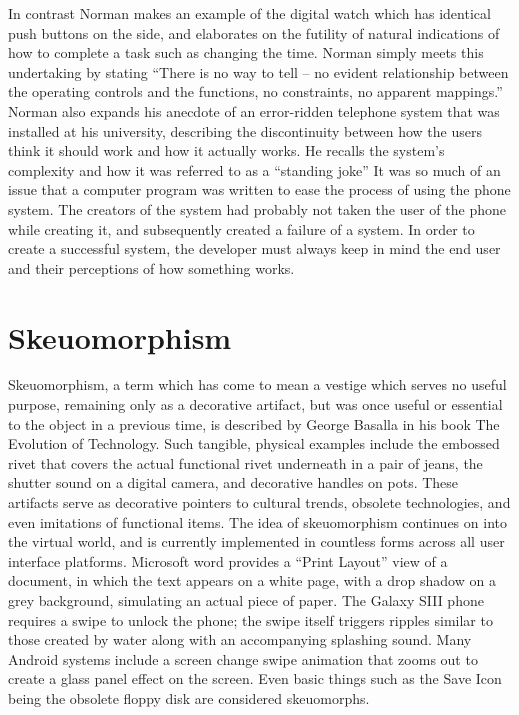 \documentclass[12pt onesided letterpaper]{report}
\begin{document}
In contrast Norman makes an example of the digital watch which has identical push buttons on the side, and elaborates on the futility of natural indications of how to complete a task such as changing the time.  Norman simply meets this undertaking by stating “There is no way to tell – no evident relationship between the operating controls and the functions, no constraints, no apparent mappings.”\cite[~p. 13]  {norman02}  Norman also expands his anecdote of an error-ridden telephone system that was installed at his university, describing the discontinuity between how the users think it should work and how it actually works.  He recalls the system’s complexity and how it was referred to as a “standing joke” It was so much of an issue that a computer program was written to ease the process of using the phone system.  The creators of the system had probably not taken the user of the phone while creating it, and subsequently created a failure of a system.  In order to create a successful system, the developer must always keep in mind the end user and their perceptions of how something works.

\section*{Skeuomorphism}
Skeuomorphism, a term which has come to mean a vestige which serves no useful purpose, remaining only as a decorative artifact, but was once useful or essential to the object in a previous time, is described by George Basalla in his book The Evolution of Technology.\cite[~p. 107-108]  {basalla88}  Such tangible, physical examples include the embossed rivet that covers the actual functional rivet underneath in a pair of jeans, the shutter sound on a digital camera, and decorative handles on pots.   These artifacts serve as decorative pointers to cultural trends, obsolete technologies, and even imitations of functional items.  The idea of skeuomorphism continues on into the virtual world, and is currently implemented in countless forms across all user interface platforms.  Microsoft word provides a “Print Layout” view of a document, in which the text appears on a white page, with a drop shadow on a grey background, simulating an actual piece of paper.  The Galaxy SIII phone requires a swipe to unlock the phone; the swipe itself triggers ripples similar to those created by water along with an accompanying splashing sound.  Many Android systems include a screen change swipe animation that zooms out to create a glass panel effect on the screen.  Even basic things such as the Save Icon being the obsolete floppy disk are considered skeuomorphs.  
\end{document}
